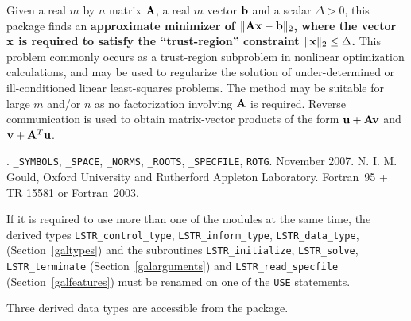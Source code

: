 \documentclass{galahad}
\newcommand{\packagename}{LS\-TR}
\newcommand{\fullpackagename}{\libraryname\_\packagename}
\begin{document}
\galheader


\galsummary
Given a real $m$ by $n$ matrix ${\mathbf{A}}$, a real
$m$ vector ${\mathbf{b}}$ and a scalar $\Delta>0$, this package finds an
{\bf approximate minimizer of $\| {\mathbf{A}} {\mathbf{x}} - {\mathbf{b}}\|_2$, where the vector
${\mathbf{x}}$ is required to satisfy the ``trust-region''
constraint $\|{\mathbf{x}}\|_2 \leq  \Delta$.}
This problem commonly occurs as a trust-region subproblem in nonlinear
optimization calculations, and may be used to regularize the solution
of under-determined or ill-conditioned linear least-squares problems.
The method may be suitable for large $m$ and/or $n$ as no factorization
involving ${\mathbf{A}}$ is required. Reverse communication is used to obtain
matrix-vector products of the form ${\mathbf{u}} + {\mathbf{A}} {\mathbf{v}}$ and
${\mathbf{v}} + {\mathbf{A}}^T {\mathbf{u}}$.


\galattributes
\galversions{\tt  \fullpackagename\_single, \fullpackagename\_double}.
\galuses
{\tt \libraryname\_SY\-M\-BOLS},
{\tt \libraryname\_SPACE}, {\tt \libraryname\_\-NORMS},
{\tt \libraryname\_ROOTS}, {\tt \libraryname\_SPECFILE},
{\tt *ROTG}.
\galdate November 2007.
\galorigin N. I. M. Gould, Oxford University and Rutherford Appleton Laboratory.
\gallanguage Fortran~95 + TR 15581 or Fortran~2003.


\galhowto



\noindent
If it is required to use more than one of the modules at the same time, 
the derived types
{\tt \packagename\_control\_type}, {\tt \packagename\_inform\_type},
{\tt \packagename\_data\_type},
(Section~\ref{galtypes})
and the subroutines
{\tt \packagename\_initialize},
{\tt \packagename\_solve}, {\tt \packagename\_terminate}
(Section~\ref{galarguments})
and
{\tt \packagename\_read\_specfile}
(Section~\ref{galfeatures})
must be renamed on one of the {\tt USE} statements.





\galtypes
Three derived data types are accessible from the package.

\end{document}
